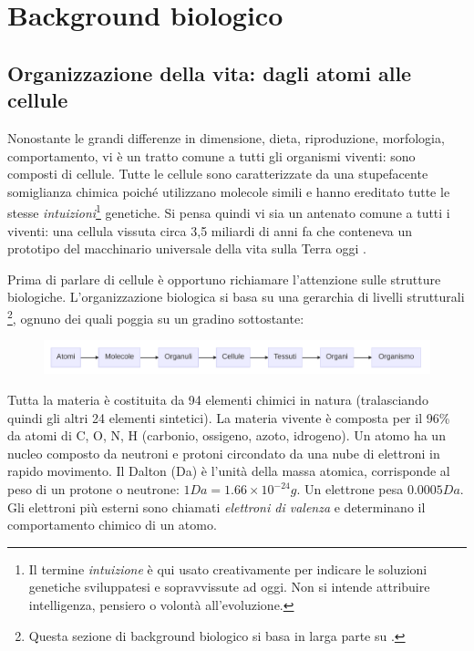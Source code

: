 \clearpage

\section{Background biologico}
\subsection{Organizzazione della vita: dagli atomi alle cellule}
Nonostante le grandi differenze in dimensione, dieta, riproduzione, morfologia, comportamento, vi è un tratto comune a tutti gli organismi viventi: sono composti di cellule. Tutte le cellule sono caratterizzate da una stupefacente somiglianza chimica poiché utilizzano molecole simili e hanno ereditato tutte le stesse \textit{intuizioni}\footnote{Il termine \textit{intuizione} è qui usato creativamente per indicare le soluzioni genetiche sviluppatesi e sopravvissute ad oggi. Non si intende attribuire intelligenza, pensiero o volontà all'evoluzione.} genetiche. Si pensa quindi vi sia un antenato comune a tutti i viventi: una cellula vissuta circa 3,5 miliardi di anni fa che conteneva un prototipo del macchinario universale della vita sulla Terra oggi \supercite{alberts2018essential}. \\

\par Prima di parlare di cellule è opportuno richiamare l'attenzione sulle strutture biologiche. L'organizzazione biologica si basa su una gerarchia di livelli strutturali \footnote{Questa sezione di background biologico si basa in larga parte su .}, ognuno dei quali poggia su un gradino sottostante: 

\begin{figure}[h]
	\centering
	\includegraphics[scale=0.45] {images/strutture_biologiche.png}
\end{figure}


\par Tutta la materia è costituita da 94 elementi chimici in natura\supercite{elementiNaturaWiki} (tralasciando quindi gli altri 24 elementi sintetici). La materia vivente è composta per il 96\% da atomi di C, O, N, H (carbonio, ossigeno, azoto, idrogeno). Un atomo ha un nucleo composto da neutroni e protoni circondato da una nube di elettroni in rapido movimento. Il Dalton (Da) è l'unità della massa atomica, corrisponde al peso di un protone o neutrone: $1 Da = 1.66 \times 10^{-24}g$. Un elettrone pesa $0.0005 Da$. Gli elettroni più esterni sono chiamati \textit{elettroni di valenza} e determinano il comportamento chimico di un atomo.

